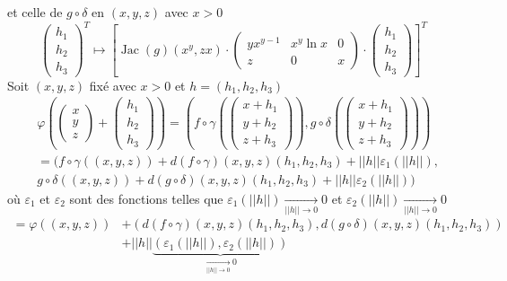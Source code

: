 \documentclass{report}
\begin{document}
et celle de $g\circ \delta$ en $(x,y,z)$ avec $x>0$
$$ \begin{pmatrix}
h_1 \\
h_2 \\
h_3
\end{pmatrix}^T \mapsto \left[\operatorname{Jac}(g)(x^y,zx) \cdot \begin{pmatrix}
yx^{y-1} & x^y\ln x & 0 \\
z & 0 & x
\end{pmatrix}\cdot \begin{pmatrix}
h_1 \\
h_2 \\
h_3
\end{pmatrix}\right]^T $$
Soit $(x,y,z)$ fixé avec $x>0$ et $h=(h_1,h_2,h_3)$ $$\begin{aligned} &\varphi\left( \begin{pmatrix} x \\y \\z \end{pmatrix} + \begin{pmatrix} h_1 \\ h_2 \\ h_3\end{pmatrix}\right) = \left( f\circ \gamma\left(\begin{pmatrix} x+h_1 \\y+h_2 \\z+h_3 \end{pmatrix}\right), g\circ \delta\left(\begin{pmatrix} x+h_1 \\y+h_2 \\z+h_3 \end{pmatrix}\right) \right)\\
&= (f\circ \gamma \left( (x,y,z)\right) + d(f\circ \gamma)\left(x,y,z\right) \left( h_1 , h_2 , h_3\right)+ ||h||\varepsilon_1(||h||),\\ 
&g\circ \delta \left( (x,y,z)\right) + d(g\circ \delta)\left(x,y,z\right) \left( h_1 , h_2 , h_3\right)+ ||h||\varepsilon_2(||h||)) \end{aligned}$$
où $\varepsilon_1$ et $\varepsilon_2$ sont des fonctions telles que $\varepsilon_1(||h||) \xrightarrow[||h||\to 0]{}0$ et $\varepsilon_2(||h||) \xrightarrow[||h||\to 0]{}0$
$$\begin{aligned}
=\varphi((x,y,z)) &+ (d(f\circ \gamma)\left(x,y,z\right) \left( h_1 , h_2 , h_3\right),d(g\circ \delta)\left(x,y,z\right) \left( h_1 , h_2 , h_3\right))\\
&+ ||h||\underbrace{(\varepsilon_1(||h||),\varepsilon_2(||h||))}_{\xrightarrow[||h||\to 0]{}0}
\end{aligned} $$
\end{document}
